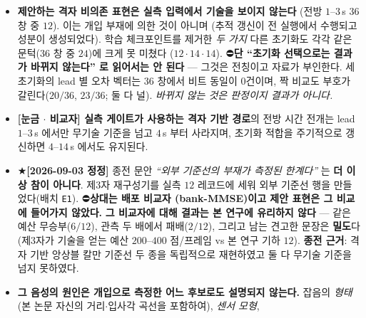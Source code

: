 \documentclass[11pt]{report}
\numberwithin{equation}{chapter}
\numberwithin{figure}{chapter}
\numberwithin{table}{chapter}
\begin{document}
\begin{itemize}
  \item \textbf{제안하는 격자 비의존 표현은 실측 입력에서 기술을 보이지 않는다}
        (전방 $1$--$3$\,s $36$ 창 중 $12$). 이는 개입 부재에 의한 것이 아니며
        (추적 갱신이 전 실행에서 수행되고 성분이 생성되었다). 학습 체크포인트를 제거한
        \emph{두 가지} 다른 초기화도 각각 같은 문턱($36$ 창 중 $24$)에 크게 못 미쳤다
        ($12\cdot14\cdot14$).
        ⛔\textbf{단 ``초기화 선택으로는 결과가 바뀌지 않는다'' 로 읽어서는 안 된다} ---
        그것은 전칭이고 자료가 부인한다. 세 초기화의 lead 별 오차 벡터는 $36$ 창에서
        비트 동일이 $0$건이며, 짝 비교도 부호가 갈린다($20/36$, $23/36$; 둘 다 널).
        \emph{바뀌지 않는 것은 판정이지 결과가 아니다.}
  \item \textbf{[눈금 $\cdot$ 비교자] 실측 게이트가 사용하는 격자 기반 경로}의 전방 시간 전개는
        lead $1$--$3$\,s 에서만 무기술 기준을 넘고 $4$\,s 부터 사라지며, 초기화 적합을
        주기적으로 갱신하면 $4$--$14$\,s 에서도 유지된다.
  \item ★\textbf{[2026-09-03 정정]} 종전 문안 \emph{``외부 기준선의 부재가 측정된
        한계다''} 는 \textbf{더 이상 참이 아니다}. 제3자 재구성기를 실측 $12$ 레코드에
        세워 외부 기준선 행을 만들었다(배치 \texttt{E1}). ⛔\textbf{상대는 배포 비교자
        (bank-MMSE)이고 제안 표현은 그 비교에 들어가지 않았다.} \textbf{그 비교자에 대해
        결과는 본 연구에
        유리하지 않다} --- 같은 예산 무승부($6/12$), 관측 두 배에서 패배($2/12$),
        그리고 남는 견고한 문장은 \textbf{밀도}다(제3자가 기술을 얻는 예산 $200$--$400$
        점/프레임 vs 본 연구 기하 $12$). \textbf{종전 근거}: 격자 기반 앙상블 칼만
        기준선 두 종을 독립적으로 재현하였고 둘 다
        무기술 기준을 넘지 못하였다.
  \item \textbf{그 음성의 원인은 개입으로 측정한 어느 후보로도 설명되지 않는다.} 잡음의
        \emph{형태}(본 논문 자신의 거리$\cdot$입사각 곡선을 포함하여), \emph{센서 모형},

\end{itemize}
\end{document}
